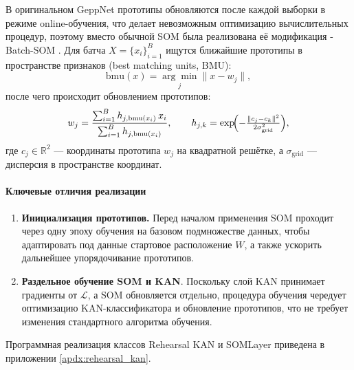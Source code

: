 \documentclass[a4paper,14pt]{extarticle}
\begin{document}
В оригинальном GeppNet прототипы обновляются после каждой выборки в режиме
online-обучения, что делает невозможным оптимизацию вычислительных процедур,
поэтому вместо обычной SOM была реализована её модификация - Batch-SOM
\cite{cheng1997convergence}. Для батча \(X=\{x_{i}\}_{i=1}^{B}\) ищутся
ближайшие прототипы в пространстве признаков (best matching units, BMU):
\begin{equation}
    \mathrm{bmu}(x)=\underset{j}{\arg\min}\lVert x-w_j\rVert,
\end{equation}
после чего происходит обновлением прототипов:
\begin{equation}
    w_{j}=\frac{\sum_{i=1}^{B}h_{j,\mathrm{bmu}(x_{i})}\,x_{i}}{\sum_{i=1}^{B}h_{j,\mathrm{bmu}(x_{i})}},\\
    \qquad h_{j,k}=\exp\!\Bigl(-\tfrac{\lVert c_{j}-c_{k}\rVert^{2}}{2\sigma_{\text{grid}}^{2}}\Bigr),
    \label{eq:batch_som_update}
\end{equation}
где \(c_{j}\in\mathbb{R}^{2}\) — координаты прототипа \(w_{j}\) на квадратной
решётке, а \(\sigma_{\text{grid}}\) — дисперсия в пространстве координат.  
\paragraph{Ключевые отличия реализации}
\begin{enumerate}
    \item \textbf{Инициализация прототипов.}  
        Перед началом применения SOM проходит через одну эпоху обучения на
        базовом подмножестве данных, чтобы адаптировать под данные стартовое
        расположение \(W\), а также ускорить дальнейшее упорядочивание прототипов.
    \item \textbf{Раздельное обучение SOM и KAN}.  
        Поскольку слой KAN принимает градиенты от $\mathcal{L}$, а SOM обновляется
        отдельно, процедура обучения чередует оптимизацию KAN-классификатора
        и обновление прототипов, что не требует изменения стандартного алгоритма
        обучения.
\end{enumerate}

Программная реализация классов Rehearsal KAN и SOMLayer приведена в приложении
\ref{apdx:rehearsal_kan}.
\end{document}
